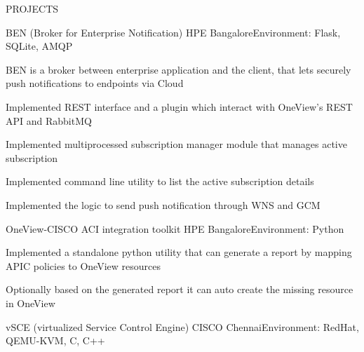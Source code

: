 \documentclass{resume} %
\begin{document}
\begin{rSection}{PROJECTS}

\begin{rSubsection}{BEN (Broker for Enterprise Notification)}
{HPE Bangalore}{Environment: Flask, SQLite, AMQP}{ }  %

\vspace{-3pt}

\item BEN is a broker between enterprise application and the client, that lets securely push notifications to endpoints via Cloud
\item Implemented REST interface and a plugin which interact with OneView's REST API and RabbitMQ
\item Implemented multiprocessed subscription manager module that manages active subscription
\item Implemented command line utility to list the active subscription details
\item Implemented the logic to send push notification through WNS and GCM

\end{rSubsection}


\begin{rSubsection}{OneView-CISCO ACI integration toolkit}
{HPE Bangalore}{Environment: Python}{ }  %

\vspace{-3pt}

\item Implemented a standalone python utility that can generate a report by mapping APIC policies to OneView resources 
\item Optionally based on the generated report it can auto create the missing resource in OneView

\end{rSubsection}


\begin{rSubsection}{vSCE (virtualized Service Control Engine)}
{CISCO Chennai}{Environment: RedHat, QEMU-KVM, C, C++}{ }  %


\end{rSubsection}
\end{rSection}
\end{document}
